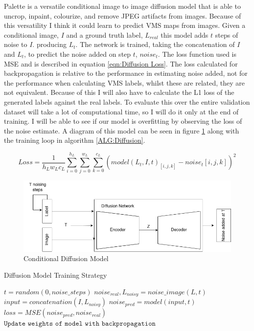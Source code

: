 \documentclass{UoYCSproject}
\begin{document}
Palette \cite{saharia2022palette} is a versatile conditional image to image diffusion model that is able to uncrop, inpaint, colourize, and remove JPEG artifacts from images. Because of this versatility I think it could learn to predict VMS maps from images. 
Given a conditional image, $ I $ and a ground truth label, $ L_{real} $ this model adds $ t $ steps of noise to $ I $. producing $L_t$. The network is trained, taking the concatenation of $ I $ and $ L_t $, to predict the noise added on step $ t $, $noise_t$. The loss function used is MSE and is described in equation \ref{eqn:Diffusion Loss}. The loss calculated for backpropagation is relative to the performance in estimating noise added, not for the performance when calculating VMS labels, whilst these are related, they are not equivalent. Because of this I will also have to calculate the L1 loss of the generated labels against the real labels. To evaluate this over the entire validation dataset will take a lot of computational time, so I will do it only at the end of training. I will be able to see if our model is overfitting by observing the loss of the noise estimate. A diagram of this model can be seen in figure \ref{fig:DiffusionDiagram} along with the training loop in algorithm \ref{ALG:Diffusion}.

\begin{equation}
    \label{eqn:Diffusion Loss}
    Loss = \frac{1}{h_Lw_Lc_L} \sum_{i=0}^{h_L} \sum_{j=0}^{w_L} \sum_{k=0}^{c_L} (model(L_{t}, I, t)_{[i,j,k]} - noise_t[i,j,k] )^2
\end{equation}

\begin{figure}[ht]
    \centering
    \includegraphics[width=\linewidth]{Diffusion Model}
    \caption{Conditional Diffusion Model}
    \label{fig:DiffusionDiagram}
\end{figure}

\begin{algorithm}
\caption{Diffusion Model Training Strategy}\label{ALG:Diffusion}
\begin{algorithmic}[1]
\State
\State $t = random(0, noise\_steps)$
\State $noise_{real}, L_{noisy} = noise\_image(L, t)$ 
\State
\State $input = concatenation(I, L_{noisy})$
\State $noise_{pred} = model(input, t)$
\State $loss = MSE( noise_{pred}, noise_{real} )$
\State $\texttt{Update weights of model with backpropagation}$
\EndFor
\EndFor
\end{algorithmic}
\end{algorithm}
\end{document}
